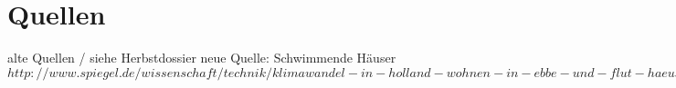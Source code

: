 \part{Quellen}
alte Quellen  / siehe Herbstdossier
neue Quelle:
Schwimmende Häuser
$http://www.spiegel.de/wissenschaft/technik/klimawandel-in-holland-wohnen-in-ebbe-und-flut-haeusern-a-800897.html$

